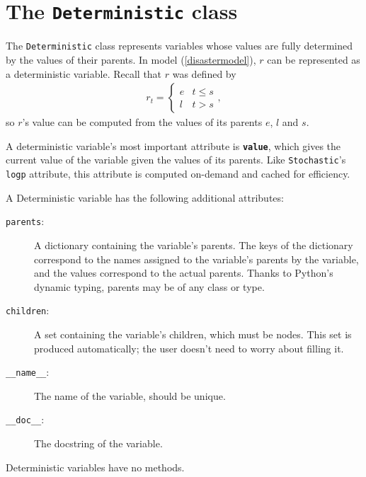 \hypertarget{deterministic}{}
\section*{The \texttt{Deterministic} class} \label{deterministic}

The \texttt{Deterministic} class represents variables whose values are fully determined by the values of their parents. In model (\ref{disastermodel}), $r$ can be represented as a deterministic variable. Recall that $r$ was defined by
\begin{eqnarray*}
    r_t=\left\{\begin{array}{ll}
        e & t\le s\\ l & t>s
        \end{array}\right.,
\end{eqnarray*}
so $r$'s value can be computed from the values of its parents $e$, $l$ and $s$.

A deterministic variable's most important attribute is \texttt{\bfseries value}, which gives the current value of the variable given the values of its parents. Like \texttt{Stochastic}'s \texttt{logp} attribute, this attribute is computed on-demand and cached for efficiency.

A Deterministic variable has the following additional attributes:
\begin{description}
    \item[\texttt{parents}:] A dictionary containing the variable's parents. The keys of the dictionary correspond to the names assigned to the variable's parents by the variable, and the values correspond to the actual parents. Thanks to Python's dynamic typing, parents may be of any class or type.
    \item[\texttt{children}:] A set containing the variable's children, which must be nodes. This set is produced automatically; the user doesn't need to worry about filling it.
    \item[\texttt{__name__}:] The name of the variable, should be unique.
    \item[\texttt{__doc__}:] The docstring of the variable.
\end{description}
Deterministic variables have no methods.


